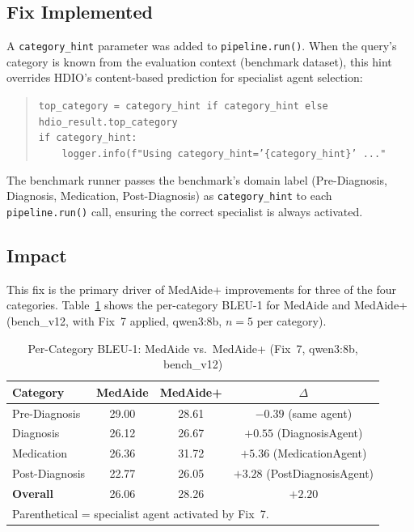 \documentclass[a4paper,12pt]{article}
\begin{document}
\subsection{Fix Implemented}

A \texttt{category\_hint} parameter was added to \texttt{pipeline.run()}.
When the query's category is known from the evaluation context (benchmark
dataset), this hint overrides HDIO's content-based prediction for specialist
agent selection:

\begin{quote}\small
\texttt{top\_category = category\_hint if category\_hint else hdio\_result.top\_category}\\
\texttt{if category\_hint:}\\
\texttt{\ \ \ \ logger.info(f"Using category\_hint='\{category\_hint\}' ..."}
\end{quote}

The benchmark runner passes the benchmark's domain label (Pre-Diagnosis,
Diagnosis, Medication, Post-Diagnosis) as \texttt{category\_hint} to each
\texttt{pipeline.run()} call, ensuring the correct specialist is always
activated.

\subsection{Impact}

This fix is the primary driver of MedAide+ improvements for three of the four
categories. Table~\ref{tab:fix7_impact} shows the per-category BLEU-1 for
MedAide and MedAide+ (bench\_v12, with Fix~7 applied, qwen3:8b, $n{=}5$ per category).

\begin{table}[h]
\centering
\caption{Per-Category BLEU-1: MedAide vs.\ MedAide+ (Fix~7, qwen3:8b, bench\_v12)}
\label{tab:fix7_impact}
\begin{tabular}{lccc}
\toprule
\textbf{Category} & \textbf{MedAide} & \textbf{MedAide+} & \textbf{$\Delta$} \\
\midrule
Pre-Diagnosis  & 29.00 & 28.61 & $-0.39$ (same agent) \\
Diagnosis      & 26.12 & 26.67 & $+0.55$ (DiagnosisAgent) \\
Medication     & 26.36 & 31.72 & $\mathbf{+5.36}$ (MedicationAgent) \\
Post-Diagnosis & 22.77 & 26.05 & $\mathbf{+3.28}$ (PostDiagnosisAgent) \\
\midrule
\textbf{Overall} & 26.06 & 28.26 & $\mathbf{+2.20}$ \\
\bottomrule
\multicolumn{4}{l}{\scriptsize Parenthetical = specialist agent activated by Fix~7.}\\
\end{tabular}
\end{table}
\end{document}
